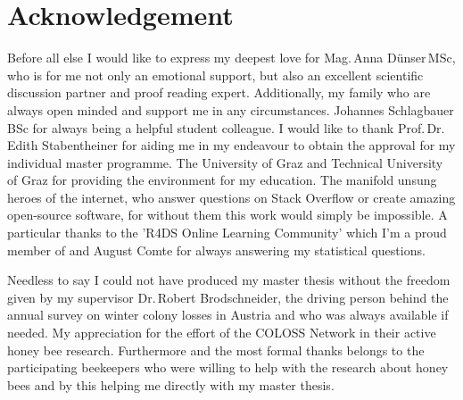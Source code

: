 \chapter*{Acknowledgement}
\label{sec:acknowledgement}
\vspace*{-10mm}

Before all else I would like to express my deepest love for Mag.\,Anna Dünser\,MSc, who is for me not only an emotional support, but also an excellent scientific discussion partner and proof reading expert. Additionally, my family who are always open minded and support me in any circumstances. Johannes Schlagbauer\,BSc for always being a helpful student colleague. I would like to thank Prof.\,Dr.\,Edith Stabentheiner for aiding me in my endeavour to obtain the approval for my individual master programme. The University of Graz and Technical University of Graz for providing the environment for my education. The manifold unsung heroes of the internet, who answer questions on Stack Overflow or create amazing open-source software, for without them this work would simply be impossible. A particular thanks to the 'R4DS Online Learning Community' which I'm a proud member of and August Comte for always answering my statistical questions.

Needless to say I could not have produced my master thesis without the freedom given by my supervisor Dr.\,Robert Brodschneider, the driving person behind the annual survey on winter colony losses in Austria and who was always available if needed. My appreciation for the effort of the COLOSS Network in their active honey bee research. Furthermore and the most formal thanks belongs to the participating beekeepers who were willing to help with the research about honey bees and by this helping me directly with my master thesis.